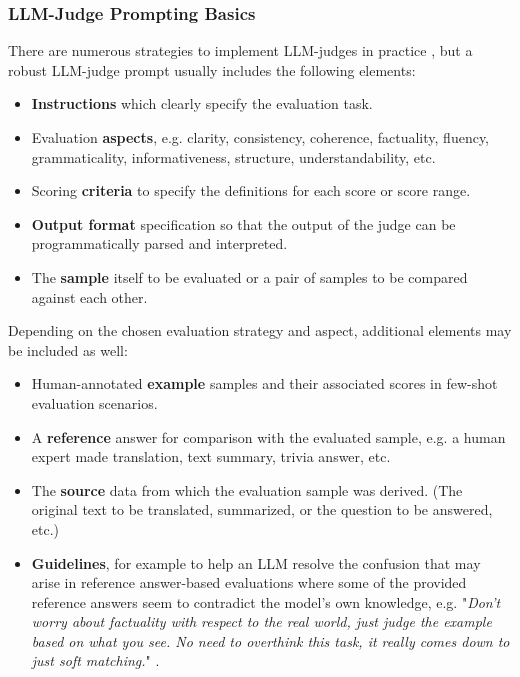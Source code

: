 \documentclass[noindent,nohyp,parspace,titlepage,twoside,12pt]{article}
\begin{document}
      \subsubsection{LLM-Judge Prompting Basics}

        There are numerous strategies to implement LLM-judges in practice
        \cite{judgetaxonomy}, but a robust LLM-judge prompt usually includes
        the following elements:

        \begin{itemize}
          \item \textbf{Instructions} which clearly specify the evaluation task.

          \item Evaluation \textbf{aspects}, e.g. clarity, consistency,
                coherence, factuality, fluency, grammaticality,
                informativeness, structure, understandability, etc.

          \item Scoring \textbf{criteria} to specify the definitions for each
                score or score range.

          \item \textbf{Output format} specification so that the output of the
                judge can be programmatically parsed and interpreted.

          \item The \textbf{sample} itself to be evaluated or a pair of samples
                to be compared against each other.
        \end{itemize}

        Depending on the chosen evaluation strategy and aspect, additional
        elements may be included as well:

        \begin{itemize}
          \item Human-annotated \textbf{example} samples and their associated
                scores in few-shot evaluation scenarios.

          \item A \textbf{reference} answer for comparison with the evaluated
                sample, e.g. a human expert made translation, text summary,
                trivia answer, etc.

          \item The \textbf{source} data from which the evaluation sample was
                derived. (The original text to be translated, summarized, or
                the question to be answered, etc.)

          \item \textbf{Guidelines}, for example to help an LLM resolve the
                confusion that may arise in reference answer-based evaluations
                where some of the provided reference answers seem to contradict
                the model's own knowledge, e.g. "\emph{Don't worry
                about factuality with respect to the real world, just judge the
                example based on what you see.  No need to overthink this task,
                it really comes down to just soft matching.}" \cite{juries}.
        \end{itemize}
\end{document}
